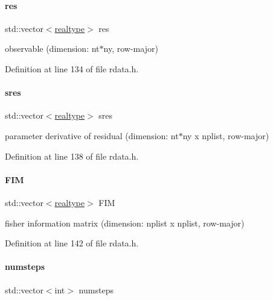 \paragraph{\texorpdfstring{res}{res}}
{\footnotesize\ttfamily std\+::vector$<$\mbox{\hyperlink{namespaceamici_a1bdce28051d6a53868f7ccbf5f2c14a3}{realtype}}$>$ res}

observable (dimension\+: nt$\ast$ny, row-\/major) 

Definition at line 134 of file rdata.\+h.

\mbox{\label{classamici_1_1_return_data_a799ab0ed6276a81d6c3afd20654f8193}} 
\paragraph{\texorpdfstring{sres}{sres}}
{\footnotesize\ttfamily std\+::vector$<$\mbox{\hyperlink{namespaceamici_a1bdce28051d6a53868f7ccbf5f2c14a3}{realtype}}$>$ sres}

parameter derivative of residual (dimension\+: nt$\ast$ny x nplist, row-\/major) 

Definition at line 138 of file rdata.\+h.

\mbox{\label{classamici_1_1_return_data_ac7b78ca07fbf54e5dd558d5fdf520cf0}} 
\paragraph{\texorpdfstring{F\+IM}{FIM}}
{\footnotesize\ttfamily std\+::vector$<$\mbox{\hyperlink{namespaceamici_a1bdce28051d6a53868f7ccbf5f2c14a3}{realtype}}$>$ F\+IM}

fisher information matrix (dimension\+: nplist x nplist, row-\/major) 

Definition at line 142 of file rdata.\+h.

\mbox{\label{classamici_1_1_return_data_acde98b0742196966453b28674762f58f}} 
\paragraph{\texorpdfstring{numsteps}{numsteps}}
{\footnotesize\ttfamily std\+::vector$<$int$>$ numsteps}

